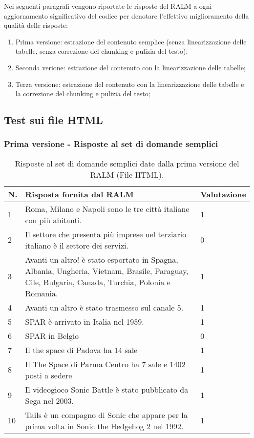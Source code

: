 Nei seguenti paragrafi vengono riportate le risposte del RALM a ogni aggiornamento significativo del codice per denotare l'effettivo miglioramento della qualità delle risposte:

\begin{enumerate}
    \item Prima versione: estrazione del contenuto semplice (senza linearizzazione delle tabelle, senza correzione del chunking e pulizia del testo);
    \item Seconda verione: estrazione del contenuto con la linearizzazione delle tabelle;
    \item Terza versione: estrazione del contenuto con la linearizzazione delle tabelle e la correzione del chunking e pulizia del testo;

\end{enumerate}


\subsection{Test sui file HTML}

\subsubsection{Prima versione - Risposte al set di domande semplici}

\begin{table}[H]
    \centering
    \begin{tabular}{|p{0.5cm} |p{6cm} |p{2cm}|}
        \hline
        \textbf{N}. & \textbf{Risposta fornita dal RALM} & \textbf{Valutazione} \\
        \hline
        1 & Roma, Milano e Napoli sono le tre città italiane con più abitanti. & 1 \\
        \hline
        2 & Il settore che presenta più imprese nel terziario italiano è il settore dei servizi. & 0 \\
        \hline
        3 & Avanti un altro! è stato esportato in Spagna, Albania, Ungheria, Vietnam, Brasile, Paraguay, Cile, Bulgaria, Canada, Turchia, Polonia e Romania. & 1 \\
        \hline
        4 & Avanti un altro è stato trasmesso sul canale 5. & 1 \\
        \hline
        5 & SPAR è arrivato in Italia nel 1959. & 1 \\
        \hline
        6 &  SPAR in Belgio & 0 \\
        \hline
        7 & Il the space di Padova ha 14 sale & 1 \\
        \hline
        8 & Il The Space di Parma Centro ha 7 sale e 1402 posti a sedere & 1 \\
        \hline
        9 & Il videogioco Sonic Battle è stato pubblicato da Sega nel 2003. & 1 \\
        \hline
        10 & Tails è un compagno di Sonic che appare per la prima volta in Sonic the Hedgehog 2 nel 1992. & 1 \\
        \hline
    \end{tabular}
    \caption{Risposte al set di domande semplici date dalla prima versione del RALM (File HTML).}
\end{table}

